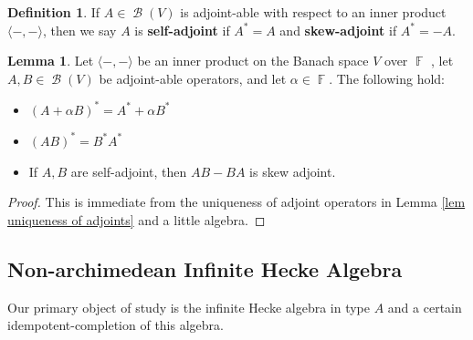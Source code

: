 \documentclass[12pt,reqno]{amsart}
\theoremstyle{definition}
\newtheorem{lem}[thm]{Lemma}
\newtheorem{defn}[thm]{Definition}
\DeclareMathOperator{\bF}{\mathbb{F}}
\DeclareMathOperator{\cB}{\mathcal{B}}
\begin{document}
\begin{defn}
    If $A \in \cB(V)$ is adjoint-able with respect to an inner product $\langle-,-\rangle$, then we say $A$ is \textbf{self-adjoint} if $A^* = A$ and \textbf{skew-adjoint} if $A^* = -A.$
\end{defn}

\begin{lem}\label{lem adjoint properties}
    Let $\langle-,-\rangle$ be an inner product on the Banach space $V$ over $\bF$ , let $A,B \in \cB(V)$ be adjoint-able operators, and let $\alpha \in \bF$. The following hold:
    \begin{itemize}
        \item $(A + \alpha B)^* = A^* + \alpha B^*$
        \item $(AB)^* = B^* A^*$
        \item If $A,B$ are self-adjoint, then $AB-BA$ is skew adjoint.
    \end{itemize}
\end{lem}
\begin{proof}
    This is immediate from the uniqueness of adjoint operators in Lemma \ref{lem uniqueness of adjoints} and a little algebra.
\end{proof}


\subsection{Non-archimedean Infinite Hecke Algebra}

Our primary object of study is the infinite Hecke algebra in type $A$ and a certain idempotent-completion of this algebra.
\end{document}
